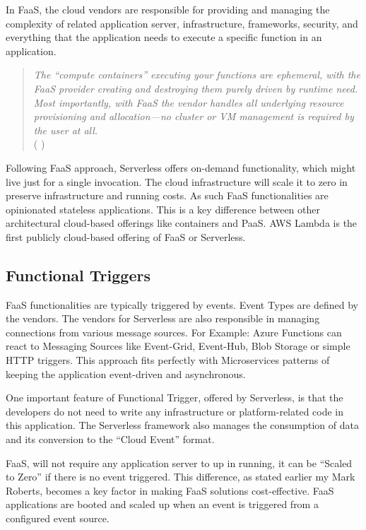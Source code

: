 \documentclass{article}
\begin{document}
\par
\begin{flushleft}
In FaaS, the cloud vendors are responsible for providing and managing the complexity of related application server, infrastructure, frameworks, security, and everything that the application needs to execute a specific function in an application. 

\begin{quote}
\textit{
The “compute containers” executing your functions are ephemeral, with the FaaS provider creating and destroying them purely driven by runtime need. Most importantly, with FaaS the vendor handles all underlying resource provisioning and allocation—no cluster or VM management is required by the user at all.}\\ ( \cite{Roberts_Mike_2018} )
\end{quote}

Following FaaS approach, Serverless offers on-demand functionality, which might live just for a single invocation. The cloud infrastructure will scale it to zero in preserve infrastructure and running costs. As such FaaS functionalities are opinionated stateless applications. This is a key difference between other architectural cloud-based offerings like containers and PaaS. 
 AWS Lambda is the first publicly cloud-based offering of FaaS or Serverless. 

\subsection{Functional Triggers}
FaaS functionalities are typically triggered by events. Event Types are defined by the vendors. The vendors for Serverless are also responsible in managing connections from various message sources. For Example:  Azure Functions can react to Messaging Sources like Event-Grid, Event-Hub, Blob Storage or simple HTTP triggers. This approach fits perfectly with Microservices patterns of keeping the application event-driven and asynchronous.

One important feature of Functional Trigger, offered by Serverless, is that the developers do not need to write any infrastructure or platform-related code in this application. The Serverless framework also manages the consumption of data and its conversion to the “Cloud Event” format.

FaaS, will not require any application server to up in running, it can be “Scaled to Zero” if there is no event triggered. This difference, as stated earlier my Mark Roberts, becomes a key factor in making FaaS solutions cost-effective. FaaS applications are booted and scaled up when an event is triggered from a configured event source.


\end{flushleft}
\end{document}

